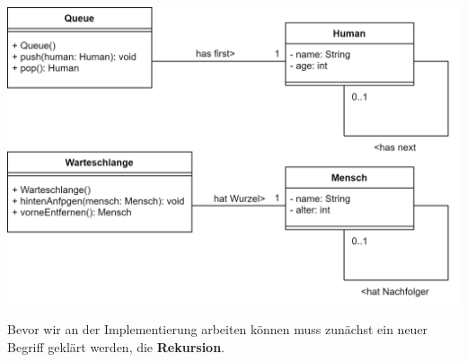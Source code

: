 \documentclass{article}
\begin{document}
\begin{center}
    \includegraphics[scale=0.2]{../../media/linkedlist_diagram.png}
\end{center}
Bevor wir an der Implementierung arbeiten können muss zunächst ein neuer Begriff geklärt werden, die 
\textbf{\color{red} Rekursion}.
\newpage
\end{document}
